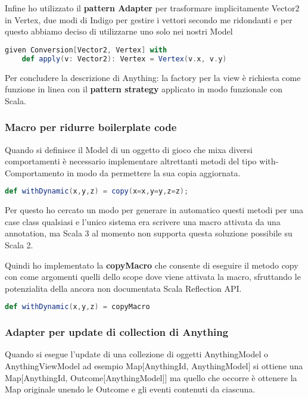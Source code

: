 Infine ho utilizzato il \textbf{pattern Adapter} per trasformare implicitamente Vector2 in Vertex, due modi di Indigo per gestire i vettori secondo me ridondanti e per questo abbiamo deciso di utilizzarne uno solo nei nostri Model
\begin{lstlisting}[language=Scala]
given Conversion[Vector2, Vertex] with
    def apply(v: Vector2): Vertex = Vertex(v.x, v.y)
\end{lstlisting}

Per concludere la descrizione di Anything: la factory per la view è richiesta come funzione in linea con il \textbf{pattern strategy} applicato in modo funzionale con Scala.


\subsubsection{Macro per ridurre boilerplate code}
Quando si definisce il Model di un oggetto di gioco che mixa diversi comportamenti è necessario implementare altrettanti metodi del tipo with-Comportamento in modo da permettere la sua copia aggiornata. 

\begin{lstlisting}[language=Scala]
def withDynamic(x,y,z) = copy(x=x,y=y,z=z); 
\end{lstlisting}

Per questo ho cercato un modo per generare in automatico questi metodi per una case class qualsiasi e l'unico sistema era scrivere una macro attivata da una annotation, ma Scala 3 al momento non supporta questa soluzione possibile su Scala 2.

Quindi ho implementato la \textbf{copyMacro} che consente di eseguire il metodo copy con come argomenti quelli dello scope dove viene attivata la macro, sfruttando le potenzialita della ancora non documentata Scala Reflection API. 

\begin{lstlisting}[language=Scala]
def withDynamic(x,y,z) = copyMacro
\end{lstlisting}

\subsubsection{Adapter per update di collection di Anything}

Quando si esegue l'update di una collezione di oggetti AnythingModel o AnythingViewModel ad esempio Map[AnythingId, AnythingModel] si ottiene una Map[AnythingId, Outcome[AnythingModel]] ma quello che occorre è ottenere la Map originale unendo le Outcome e gli eventi contenuti da ciascuna.


